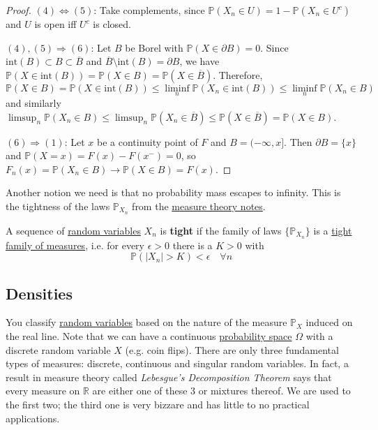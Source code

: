 \begin{proof}
    $(4) \Leftrightarrow (5)$: Take complements, since $\mathbb{P}(X_n \in U) = 1 - \mathbb{P}(X_n \in U^c)$ and $U$ is open iff $U^c$ is closed.

    $(4), (5) \Rightarrow (6)$: Let $B$ be Borel with $\mathbb{P}(X \in \partial B) = 0$. Since $\mathrm{int}(B) \subset B \subset \overline{B}$ and $\overline{B} \setminus \mathrm{int}(B) = \partial B$, we have $\mathbb{P}(X \in \mathrm{int}(B)) = \mathbb{P}(X \in B) = \mathbb{P}(X \in \overline{B})$. Therefore,
    \begin{equation}
      \mathbb{P}(X \in B) = \mathbb{P}(X \in \mathrm{int}(B)) \leq \liminf_{n} \mathbb{P}(X_n \in \mathrm{int}(B)) \leq \liminf_{n} \mathbb{P}(X_n \in B)
    \end{equation}
    and similarly $\limsup_n \mathbb{P}(X_n \in B) \leq \limsup_n \mathbb{P}(X_n \in \overline{B}) \leq \mathbb{P}(X \in \overline{B}) = \mathbb{P}(X \in B)$.

    $(6) \Rightarrow (1)$: Let $x$ be a continuity point of $F$ and $B = (-\infty, x]$. Then $\partial B = \{x\}$ and $\mathbb{P}(X = x) = F(x) - F(x^-) = 0$, so $F_n (x) = \mathbb{P}(X_n \in B) \to \mathbb{P}(X \in B) = F(x)$.
  \end{proof}

  Another notion we need is that no probability mass escapes to infinity. This is the tightness of the laws $\mathbb{P}_{X_n}$ from the \hyperref[mt-def:tight-family-of-measures]{measure theory notes}. 

  \begin{definition}
    \label{def:tight-sequence-of-random-variables}
    A sequence of \hyperref[def:random-variable]{random variables} $X_n$ is \textbf{tight} if the family of laws $\{\mathbb{P}_{X_n}\}$ is a \hyperref[mt-def:tight-family-of-measures]{tight family of measures}, i.e. for every $\epsilon > 0$ there is a $K > 0$ with 
    \begin{equation}
      \mathbb{P}(|X_n| > K) < \epsilon \quad \forall n
    \end{equation}
  \end{definition}

\subsection{Densities} 

  You classify \hyperref[def:random-variable]{random variables} based on the nature of the measure $\mathbb{P}_X$ induced on the real line. Note that we can have a continuous \hyperref[def:probability-space]{probability space} $\Omega$ with a discrete random variable $X$ (e.g. coin flips). There are only three fundamental types of measures: discrete, continuous and singular random variables. In fact, a result in measure theory called \textit{Lebesgue's Decomposition Theorem} says that every measure on $\mathbb{R}$ are either one of these 3 or mixtures thereof. We are used to the first two; the third one is very bizzare and has little to no practical applications. 

